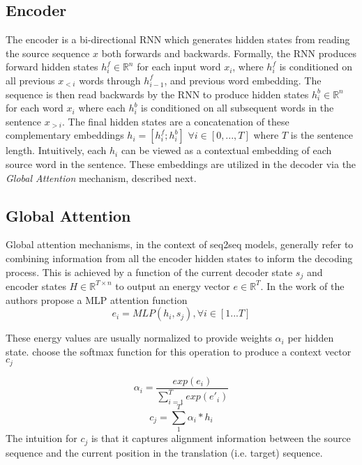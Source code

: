 \subsection{Encoder}
The encoder is a bi-directional \ac{RNN} which generates hidden states from reading the source sequence $x$ both forwards and backwards. Formally, the \ac{RNN} produces forward hidden states $h^{f}_{i} \in \mathbb{R}^{n}$ for each input word $x_{i}$, where $h^{f}_{i}$ is conditioned on all previous $x_{<i}$ words through $h_{i-1}^{f}$, and previous word embedding. The sequence is then read backwards by the \ac{RNN} to produce hidden states $h^{b}_{i} \in \mathbb{R}^{n}$ for each word $x_{i}$ where each $h^{b}_{i}$ is conditioned on all subsequent words in the sentence $x_{>i}$. The final hidden states are a concatenation of these complementary embeddings $h_{i}  = [h^{f}_{i} ; h^{b}_{i}]$ $ \forall i \in [0,...,T]$ where $T$ is the sentence length. Intuitively, each $h_{i}$ can be viewed as a contextual embedding of each source word in the sentence. These embeddings are utilized in the decoder via the \textit{Global Attention} mechanism, described next. %

\subsection{Global Attention}

Global attention mechanisms, in the context of \ac{seq2seq} models, generally refer to combining information from all the encoder hidden states to inform the decoding process. This is achieved by a function of the current decoder state $s_{j}$ and encoder states $H \in \mathbb{R}^{T \times n}$ to output an energy vector $e \in \mathbb{R}^{T}$. In the work of \citet{bahdanau2014NMTBYJoint} the authors propose a \ac{MLP} attention function
\begin{equation}
e_{i} = MLP(h_{i}, s_{j}), \forall i \in [1...T]
\end{equation}


These energy values are usually normalized to provide weights $\alpha_{i}$ per hidden state. \citet{bahdanau2014NMTBYJoint} choose the softmax function for this operation to produce a context vector $c_{j}$

\begin{equation}
	\alpha_{i} = \frac{exp(e_{i})}{\sum_{i=1}^{T} exp(e'_{i})}
\end{equation}
\begin{equation}
c_{j} = \sum_{1}^{T} \alpha_{i} * h_{i}
\end{equation}
The intuition for $c_{j}$ is that it captures alignment information between the source sequence and the current position in the translation (i.e. target) sequence. %

